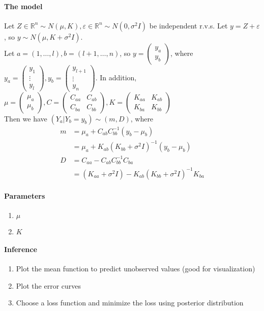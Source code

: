\documentclass[11pt]{article}
\newcommand{\real}[0]{\mathbb{R}}
\begin{document}
\paragraph{The model}
Let $Z \in \real^n \sim N(\mu, K), \varepsilon \in \real^n \sim N(0, \sigma^2I)$ be independent r.v.s. Let $y = Z + \varepsilon$, so $y \sim N(\mu, K+\sigma^2I)$.\\
Let $a = (1, \hdots, l), b = (l+1, \hdots, n)$, so $y = \begin{pmatrix}
	y_a \\ y_b \end{pmatrix}$, where $y_a = \begin{pmatrix} y_1 \\ \vdots \\y_l
	\end{pmatrix}, y_b = \begin{pmatrix} y_{l+1} \\ \vdots \\ y_n \end{pmatrix}$.
	In addition, $\mu = \begin{pmatrix} \mu_a \\ \mu_b \end{pmatrix}, C = \begin{pmatrix} C_{aa} & C_{ab} \\ C_{ba} & C_{bb} \end{pmatrix}, K = \begin{pmatrix} K_{aa} & K_{ab} \\ K_{ba} & K_{bb} \end{pmatrix}$\\
Then we have $(Y_a | Y_b = y_b) \sim (m, D)$, where 
\begin{align*}
	m &= \mu_a + C_{ab}C^{-1}_{bb}(y_b - \mu_b) \\
	&= \mu_a +K_{ab}(K_{bb} + \sigma^2 I)^{-1}(y_b - \mu_b)\\
	D &= C_{aa} - C_{ab}C^{-1}_{bb}C_{ba} \\
	&= (K_{aa}+\sigma^2 I)-K_{ab}(K_{bb}+\sigma^2I)^{-1}K_{ba}
\end{align*}
\paragraph{Parameters}
\begin{enumerate}
	\item $\mu$
	\item $K$
\end{enumerate}
\paragraph{Inference}
\begin{enumerate}
	\item Plot the mean function to predict unobserved values (good for visualization)
	\item Plot the error curves
	\item Choose a loss function and minimize the loss using posterior distribution
\end{enumerate}
\end{document}
